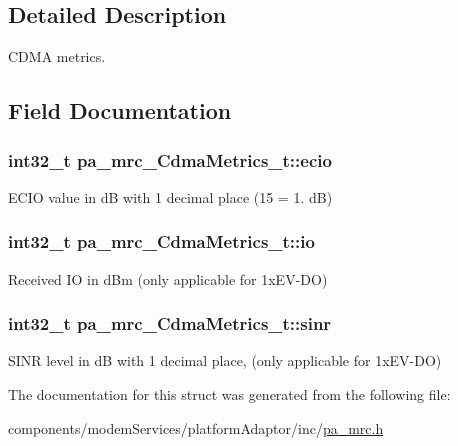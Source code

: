 \subsection{Detailed Description}
C\+D\+MA metrics. 

\subsection{Field Documentation}
\subsubsection[{\texorpdfstring{ecio}{ecio}}]{\setlength{\rightskip}{0pt plus 5cm}int32\+\_\+t pa\+\_\+mrc\+\_\+\+Cdma\+Metrics\+\_\+t\+::ecio}\hypertarget{structpa__mrc___cdma_metrics__t_ac1d427700444e30bc9aa1d5e6b6b958e}{}\label{structpa__mrc___cdma_metrics__t_ac1d427700444e30bc9aa1d5e6b6b958e}


E\+C\+IO value in dB with 1 decimal place (15 = 1. dB) 

\subsubsection[{\texorpdfstring{io}{io}}]{\setlength{\rightskip}{0pt plus 5cm}int32\+\_\+t pa\+\_\+mrc\+\_\+\+Cdma\+Metrics\+\_\+t\+::io}\hypertarget{structpa__mrc___cdma_metrics__t_ab962f1ecb4d1f515b9092160eeca1719}{}\label{structpa__mrc___cdma_metrics__t_ab962f1ecb4d1f515b9092160eeca1719}


Received IO in d\+Bm (only applicable for 1x\+E\+V-\/\+DO) 

\subsubsection[{\texorpdfstring{sinr}{sinr}}]{\setlength{\rightskip}{0pt plus 5cm}int32\+\_\+t pa\+\_\+mrc\+\_\+\+Cdma\+Metrics\+\_\+t\+::sinr}\hypertarget{structpa__mrc___cdma_metrics__t_a87713664d61eb173e6946ba913cfcb7f}{}\label{structpa__mrc___cdma_metrics__t_a87713664d61eb173e6946ba913cfcb7f}


S\+I\+NR level in dB with 1 decimal place, (only applicable for 1x\+E\+V-\/\+DO) 



The documentation for this struct was generated from the following file\+:\begin{DoxyCompactItemize}
\item 
components/modem\+Services/platform\+Adaptor/inc/\hyperlink{pa__mrc_8h}{pa\+\_\+mrc.\+h}\end{DoxyCompactItemize}
